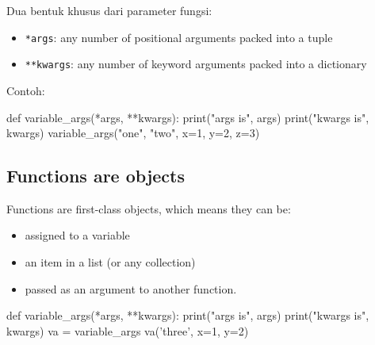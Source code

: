 Dua bentuk khusus dari parameter fungsi:
\begin{itemize}
\item \verb|*args|: any number of positional arguments packed into a tuple
\item \verb|**kwargs|: any number of keyword arguments packed into a dictionary
\end{itemize}

Contoh:

\begin{pythoncode}
def variable_args(*args, **kwargs):
    print("args is", args)
    print("kwargs is", kwargs)
variable_args("one", "two", x=1, y=2, z=3)
\end{pythoncode}


\subsection{Functions are objects}

Functions are first-class objects, which means they can be:
\begin{itemize}
\item assigned to a variable
\item an item in a list (or any collection)
\item passed as an argument to another function.
\end{itemize}

\begin{pythoncode}
def variable_args(*args, **kwargs):
    print("args is", args)
    print("kwargs is", kwargs)
va = variable_args
va('three', x=1, y=2)
\end{pythoncode}


